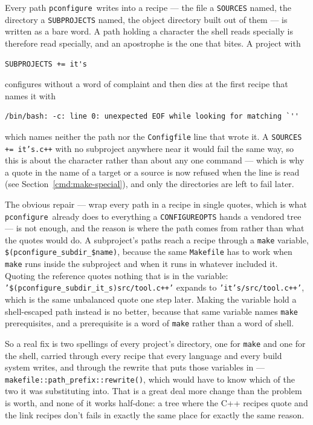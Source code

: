 \documentclass{article}
\newcommand{\pconfigure}{\texttt{pconfigure}}
\begin{document}
Every path \pconfigure\ writes into a recipe --- the file a
\texttt{SOURCES} named, the directory a \texttt{SUBPROJECTS} named,
the object directory built out of them --- is written as a bare word.
A path holding a character the shell reads specially is therefore read
specially, and an apostrophe is the one that bites.  A project with
\begin{verbatim}
SUBPROJECTS += it's
\end{verbatim}
configures without a word of complaint and then dies at the first
recipe that names it with
\begin{verbatim}
/bin/bash: -c: line 0: unexpected EOF while looking for matching `''
\end{verbatim}
which names neither the path nor the \texttt{Configfile} line that
wrote it.  A \texttt{SOURCES += it's.c++} with no subproject anywhere
near it would fail the same way, so this is about the character rather
than about any one command --- which is why a quote in the name of a
target or a source is now refused when the line is read (see
Section~\ref{cmd:make-special}), and only the directories are left to
fail later.

The obvious repair --- wrap every path in a recipe in single quotes,
which is what \pconfigure\ already does to everything a
\texttt{CONFIGUREOPTS} hands a vendored tree --- is not enough, and
the reason is where the path comes from rather than what the quotes
would do.  A subproject's paths reach a recipe through a \texttt{make}
variable, \texttt{\$(pconfigure\_subdir\_\$name)}, because the same
\texttt{Makefile} has to work when \texttt{make} runs inside the
subproject and when it runs in whatever included it.  Quoting the
reference quotes nothing that is in the variable:
\texttt{'\$(pconfigure\_subdir\_it\_s)src/tool.c++'} expands to
\texttt{'it's/src/tool.c++'}, which is the same unbalanced quote one
step later.  Making the variable hold a shell-escaped path instead is
no better, because that same variable names \texttt{make}
prerequisites, and a prerequisite is a word of \texttt{make} rather
than a word of shell.

So a real fix is two spellings of every project's directory, one for
\texttt{make} and one for the shell, carried through every recipe that
every language and every build system writes, and through the rewrite
that puts those variables in ---
\texttt{makefile::path\_prefix::rewrite()}, which would have to know
which of the two it was substituting into.  That is a great deal more
change than the problem is worth, and none of it works half-done: a
tree where the C++ recipes quote and the link recipes don't fails in
exactly the same place for exactly the same reason.
\end{document}
